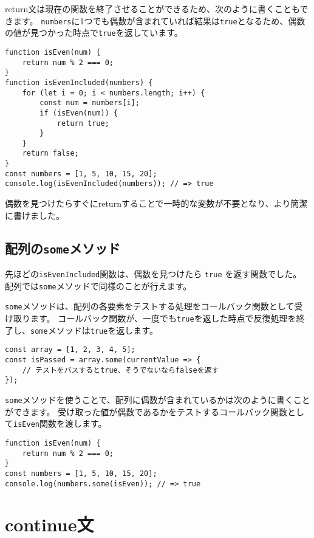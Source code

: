 return文は現在の関数を終了させることができるため、次のように書くこともできます。
\texttt{numbers}に1つでも偶数が含まれていれば結果は\texttt{true}となるため、偶数の値が見つかった時点で\texttt{true}を返しています。

\begin{lstlisting}
function isEven(num) {
    return num % 2 === 0;
}
function isEvenIncluded(numbers) {
    for (let i = 0; i < numbers.length; i++) {
        const num = numbers[i];
        if (isEven(num)) {
            return true;
        }
    }
    return false;
}
const numbers = [1, 5, 10, 15, 20];
console.log(isEvenIncluded(numbers)); // => true
\end{lstlisting}

偶数を見つけたらすぐにreturnすることで一時的な変数が不要となり、より簡潔に書けました。

\hypertarget{array-some}{%
\subsection{\texorpdfstring{配列の\texttt{some}メソッド}{配列のsomeメソッド}}\label{array-some}}

先ほどの\texttt{isEvenIncluded}関数は、偶数を見つけたら
\texttt{true} を返す関数でした。
配列では\texttt{some}メソッドで同様のことが行えます。

\texttt{some}メソッドは、配列の各要素をテストする処理をコールバック関数として受け取ります。
コールバック関数が、一度でも\texttt{true}を返した時点で反復処理を終了し、\texttt{some}メソッドは\texttt{true}を返します。

\begin{lstlisting}
const array = [1, 2, 3, 4, 5];
const isPassed = array.some(currentValue => {
    // テストをパスするとtrue、そうでないならfalseを返す
});
\end{lstlisting}

\texttt{some}メソッドを使うことで、配列に偶数が含まれているかは次のように書くことができます。
受け取った値が偶数であるかをテストするコールバック関数として\texttt{isEven}関数を渡します。

\begin{lstlisting}
function isEven(num) {
    return num % 2 === 0;
}
const numbers = [1, 5, 10, 15, 20];
console.log(numbers.some(isEven)); // => true
\end{lstlisting}

\hypertarget{continue-statement}{%
\section{continue文}\label{continue-statement}}

